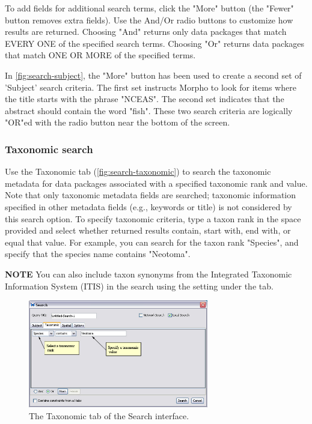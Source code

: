 To add fields for additional search terms, click the "More" button (the
"Fewer" button removes extra fields).  Use the And/Or radio buttons to
customize how results are returned. Choosing "And" returns only data
packages that match EVERY ONE of the specified search terms. Choosing
"Or" returns data packages that match ONE OR MORE of the specified
terms.

In \autoref{fig:search-subject}, the "More" button has been used to
create a second set of 'Subject' search criteria. The first set
instructs Morpho to look for items where the title starts with the
phrase "NCEAS". The second set indicates that the abstract should
contain the word "fish". These two search criteria are logically "OR"ed
with the radio button near the bottom of the screen.

\subsubsection[Taxonomic]{Taxonomic search} \label{sec:search-taxonomic}

Use the Taxonomic tab (\autoref{fig:search-taxonomic}) to search the
taxonomic metadata for data packages associated with a specified
taxonomic rank and value. Note that only taxonomic metadata fields are
searched; taxonomic information specified in other metadata fields
(e.g., keywords or title) is not considered by this search option. To
specify taxonomic criteria, type a taxon rank in the space provided and
select whether returned results contain, start with, end with, or equal
that value. For example, you can search for the taxon rank "Species",
and specify that the species name contains "Neotoma".

\begin{shaded}
  \textbf{NOTE} You can also include taxon synonyms from the Integrated
  Taxonomic Information System (ITIS) in the search using the setting
  under the  tab.
\end{shaded}

\begin{figure}
  \centering
    \includegraphics[width=0.7\textwidth]{images/search-taxonomic.jpg}
  \caption{The Taxonomic tab of the Search interface.}
  \label{fig:search-taxonomic}
\end{figure}


